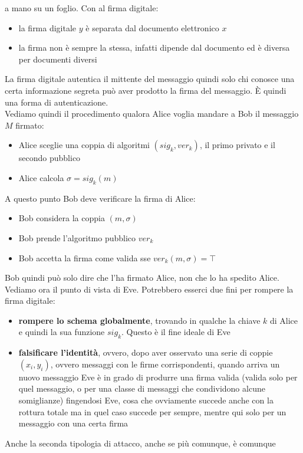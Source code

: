 \documentclass[a4paper,12pt, oneside]{book}
\begin{document}
a mano su un foglio. Con al firma digitale:
\begin{itemize}
  \item la firma digitale $y$ è separata dal documento elettronico $x$
  \item la firma non è sempre la stessa, infatti dipende dal documento ed è
  diversa per documenti diversi  
\end{itemize}
La firma digitale autentica il mittente del messaggio quindi solo chi conosce
una certa informazione segreta può aver prodotto la firma del messaggio. È
quindi una forma di autenticazione.\\
Vediamo quindi il procedimento qualora Alice voglia mandare a Bob il messaggio
$M$ firmato:
\begin{itemize}
  \item Alice sceglie una coppia di algoritmi $(sig_k,ver_k)$, il primo privato
  e il secondo pubblico
  \item Alice calcola $\sigma=sig_k(m)$
\end{itemize}
A questo punto Bob deve verificare la firma di Alice:
\begin{itemize}
  \item Bob considera la coppia $(m,\sigma)$
  \item Bob prende l'algoritmo pubblico $ver_k$
  \item Bob accetta la firma come valida sse $ver_k(m,\sigma)=\top$
\end{itemize}
Bob quindi può solo dire che l'ha firmato Alice, non che lo ha spedito Alice.\\
Vediamo ora il punto di vista di Eve. Potrebbero esserci due fini per rompere la
firma digitale:
\begin{itemize}
  \item \textbf{rompere lo schema globalmente}, trovando in qualche la chiave
  $k$ di Alice e quindi la sua funzione $sig_k$. Questo è il fine ideale di Eve
  \item \textbf{falsificare l'identità}, ovvero, dopo aver osservato una serie
  di coppie $(x_i,y_i)$, ovvero messaggi con le firme corrispondenti, quando
  arriva un nuovo messaggio Eve è in grado di produrre una firma valida (valida
  solo per quel messaggio, o per una classe di messaggi che condividono alcune
  somiglianze) fingendosi Eve, cosa che ovviamente succede anche con la rottura
  totale ma in quel caso succede per sempre, mentre qui solo per un messaggio
  con una certa firma
\end{itemize}
Anche la seconda tipologia di attacco, anche se più comunque, è comunque
\end{document}
